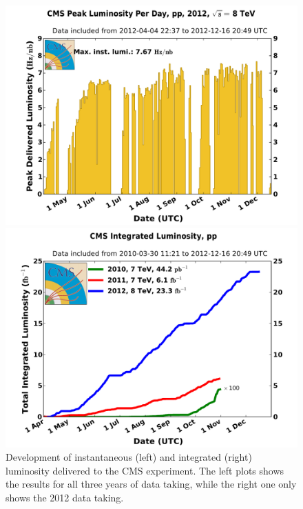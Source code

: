 \begin{figure}[htbp]
\centering
\begin{minipage}[t]{0.49\textwidth}
  \includegraphics[width=\textwidth]{plots/LHC/peak_lumi_per_day_pp_2012.pdf}
\end{minipage}
\begin{minipage}[t]{0.49\textwidth}
\includegraphics[width=\textwidth]{plots/LHC/int_lumi_cumulative_pp_2.pdf}
\end{minipage}
\caption{Development of instantaneous (left) and integrated (right) luminosity delivered to the CMS experiment. The left plots shows the results for all three years of data taking, while the right one only shows the 2012 data taking.}
\label{fig:lumiOverview}
\end{figure}
